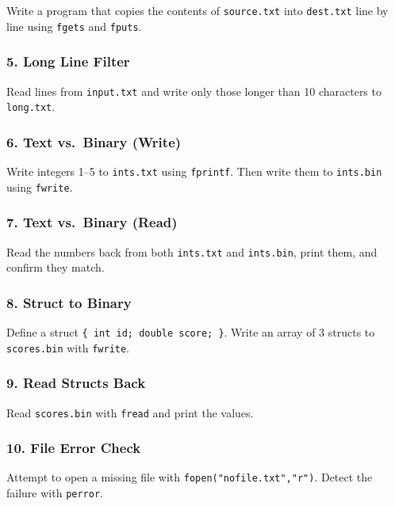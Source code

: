 \documentclass[
  letterpaper,
  DIV=11,
  numbers=noendperiod]{scrreprt}
\begin{document}
Write a program that copies the contents of \texttt{source.txt} into
\texttt{dest.txt} line by line using \texttt{fgets} and \texttt{fputs}.

\subsubsection{5. Long Line Filter}\label{long-line-filter}

Read lines from \texttt{input.txt} and write only those longer than 10
characters to \texttt{long.txt}.

\subsubsection{6. Text vs.~Binary (Write)}\label{text-vs.-binary-write}

Write integers 1--5 to \texttt{ints.txt} using \texttt{fprintf}. Then
write them to \texttt{ints.bin} using \texttt{fwrite}.

\subsubsection{7. Text vs.~Binary (Read)}\label{text-vs.-binary-read}

Read the numbers back from both \texttt{ints.txt} and \texttt{ints.bin},
print them, and confirm they match.

\subsubsection{8. Struct to Binary}\label{struct-to-binary}

Define a struct \texttt{\{\ int\ id;\ double\ score;\ \}}. Write an
array of 3 structs to \texttt{scores.bin} with \texttt{fwrite}.

\subsubsection{9. Read Structs Back}\label{read-structs-back}

Read \texttt{scores.bin} with \texttt{fread} and print the values.

\subsubsection{10. File Error Check}\label{file-error-check}

Attempt to open a missing file with \texttt{fopen("nofile.txt","r")}.
Detect the failure with \texttt{perror}.
\end{document}
